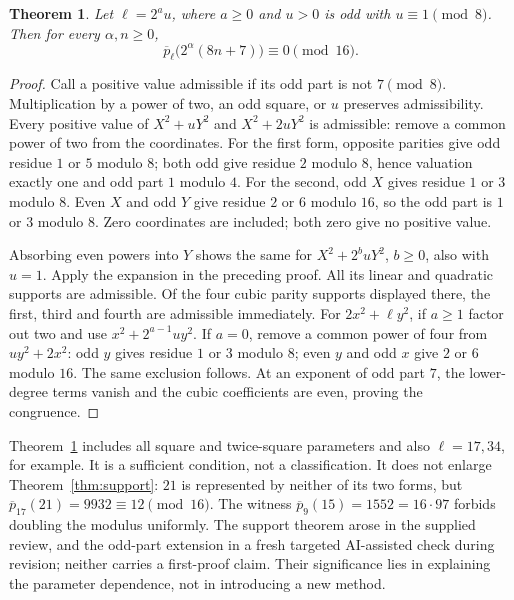 \documentclass[11pt]{article}
\newtheorem{theorem}{Theorem}\newtheorem{lemma}[theorem]{Lemma}
\theoremstyle{remark}\newtheorem{remark}[theorem]{Remark}
\newcommand{\pb}{\overline{p}}
\begin{document}
\begin{theorem}\label{thm:oddpart}
Let $\ell=2^a u$, where $a\ge0$ and $u>0$ is odd with $u\equiv1\pmod8$. Then for every $\alpha,n\ge0$,
\[\pb_\ell\bigl(2^\alpha(8n+7)\bigr)\equiv0\pmod{16}.\]
\end{theorem}
\begin{proof}
Call a positive value admissible if its odd part is not $7\pmod8$. Multiplication by a power of two, an odd square, or $u$ preserves admissibility. Every positive value of $X^2+uY^2$ and $X^2+2uY^2$ is admissible: remove a common power of two from the coordinates. For the first form, opposite parities give odd residue $1$ or $5$ modulo $8$; both odd give residue $2$ modulo $8$, hence valuation exactly one and odd part $1$ modulo $4$. For the second, odd $X$ gives residue $1$ or $3$ modulo $8$. Even $X$ and odd $Y$ give residue $2$ or $6$ modulo $16$, so the odd part is $1$ or $3$ modulo $8$. Zero coordinates are included; both zero give no positive value.

Absorbing even powers into $Y$ shows the same for $X^2+2^b uY^2$, $b\ge0$, also with $u=1$. Apply the expansion in the preceding proof. All its linear and quadratic supports are admissible. Of the four cubic parity supports displayed there, the first, third and fourth are admissible immediately. For $2x^2+\ell y^2$, if $a\ge1$ factor out two and use $x^2+2^{a-1}u y^2$. If $a=0$, remove a common power of four from $uy^2+2x^2$: odd $y$ gives residue $1$ or $3$ modulo $8$; even $y$ and odd $x$ give $2$ or $6$ modulo $16$. The same exclusion follows. At an exponent of odd part $7$, the lower-degree terms vanish and the cubic coefficients are even, proving the congruence.
\end{proof}

Theorem~\ref{thm:oddpart} includes all square and twice-square parameters and also $\ell=17,34$, for example. It is a sufficient condition, not a classification. It does not enlarge Theorem~\ref{thm:support}: $21$ is represented by neither of its two forms, but $\pb_{17}(21)=9932\equiv12\pmod{16}$. The witness $\pb_9(15)=1552=16\cdot97$ forbids doubling the modulus uniformly. The support theorem arose in the supplied review, and the odd-part extension in a fresh targeted AI-assisted check during revision; neither carries a first-proof claim. Their significance lies in explaining the parameter dependence, not in introducing a new method.
\end{document}
